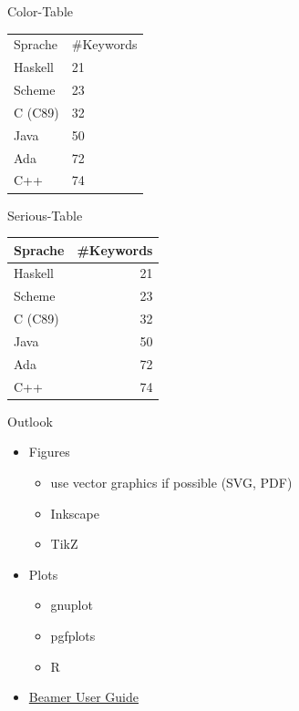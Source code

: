 \documentclass[xcolor={dvipsnames,table}]{beamer}
\begin{document}
\begin{frame}{Color-Table}
\begin{tabular}{ll}
  \rowcolor{black}
  \color{white} Sprache & \color{white} \#Keywords \\
 Haskell &  21 \\
 Scheme &  23 \\
 C (C89) &  32 \\
 Java &  50 \\
 Ada &  72 \\
 C++ &  74 \\
\end{tabular}
\end{frame}

\begin{frame}{Serious-Table}
\begin{tabular}{lr}
 \toprule
 Sprache & \#Keywords \\
 \midrule
 Haskell &  21 \\
 Scheme &  23 \\
 C (C89) &  32 \\
 Java &  50 \\
 Ada &  72 \\
 C++ &  74 \\
 \bottomrule
\end{tabular}
\end{frame}

\begin{frame}{Outlook}
  \begin{itemize}
    \item Figures
      \begin{itemize}
        \item use vector graphics if possible (SVG, PDF)
        \item Inkscape
        \item TikZ
      \end{itemize}
    \item Plots
      \begin{itemize}
        \item gnuplot
        \item pgfplots
        \item R
      \end{itemize}
    \item
      \href{http://www.ctan.org/tex-archive/macros/latex/contrib/beamer/doc/beameruserguide.pdf}{Beamer User Guide}
  \end{itemize}
\end{frame}
\end{document}
